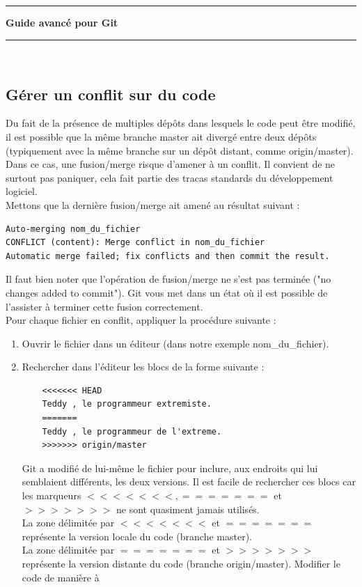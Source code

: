 \documentclass[a4paper,10pt]{article}
\newcommand{\HRule}{\rule{\linewidth}{0.1mm}}
\begin{document}
\begin{spacing}{1.5}
\newpage
\HRule
\begin{center}
  \LARGE \textbf{Guide avancé pour Git}
\end{center}
\HRule \\

\subsection*{Gérer un conflit sur du code}
Du fait de la présence de multiples dépôts dans lesquels le code peut être
modifié, il est possible que la même branche master ait divergé entre deux
dépôts (typiquement avec la même branche sur un dépôt distant, comme
origin/master). Dans ce cas, une fusion/merge risque d'amener à un conflit. Il
convient de ne surtout pas paniquer, cela fait partie des tracas standards du
développement logiciel.\\
Mettons que la dernière fusion/merge ait amené au résultat suivant :
\begin{lstlisting}
Auto-merging nom_du_fichier
CONFLICT (content): Merge conflict in nom_du_fichier
Automatic merge failed; fix conflicts and then commit the result.
\end{lstlisting}
Il faut bien noter que l'opération de fusion/merge ne s'est pas terminée ("no
changes added to commit"). Git vous met dans un état où il est possible de
l'assister à terminer cette fusion correctement.\\
Pour chaque fichier en conflit, appliquer la procédure suivante :
\begin{enumerate}
\item Ouvrir le fichier dans un éditeur (dans notre exemple nom\_du\_fichier).
\item Rechercher dans l'éditeur les blocs de la forme suivante :
  \begin{lstlisting}
    <<<<<<< HEAD
    Teddy , le programmeur extremiste.
    =======
    Teddy , le programmeur de l'extreme.
    >>>>>>> origin/master
  \end{lstlisting}
Git a modifié de lui-même le fichier pour inclure, aux endroits qui lui
semblaient différents, les deux versions. Il est facile de rechercher ces blocs
car les marqueurs $<<<<<<<, =======$ et $>>>>>>>$ ne sont quasiment jamais utilisés.\\
La zone délimitée par $<<<<<<<$ et $=======$ représente la version locale du
code (branche master).\\ La zone délimitée par $=======$ et $>>>>>>>$ représente la
version distante du code (branche origin/master). Modifier le code de manière à

\end{enumerate}
\end{spacing}
\end{document}
